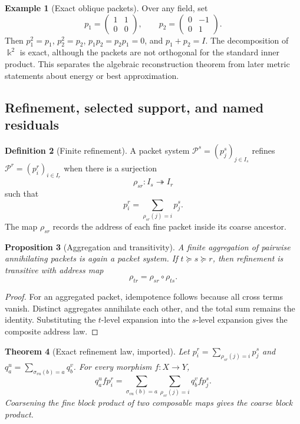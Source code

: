 \documentclass[11pt]{article}
\newtheorem{theorem}{Theorem}[section]
\newtheorem{proposition}[theorem]{Proposition}
\theoremstyle{definition}
\newtheorem{definition}[theorem]{Definition}
\newtheorem{example}[theorem]{Example}
\theoremstyle{remark}
\newcommand{\kk}{\Bbbk}
\begin{document}
\begin{example}[Exact oblique packets]
\label{ex:oblique-packets}
Over any field, set
\[
p_1=
\begin{pmatrix}
1&1\\0&0
\end{pmatrix},
\qquad
p_2=
\begin{pmatrix}
0&-1\\0&1
\end{pmatrix}.
\]
Then \(p_1^2=p_1\), \(p_2^2=p_2\), \(p_1p_2=p_2p_1=0\), and \(p_1+p_2=I\).  The decomposition of \(\kk^2\) is exact, although the packets are not orthogonal for the standard inner product.  This separates the algebraic reconstruction theorem from later metric statements about energy or best approximation.
\end{example}

\subsection{Refinement, selected support, and named residuals}
\label{subsec:refinement-residual-calculus}

\begin{definition}[Finite refinement]
\label{def:finite-refinement-expanded}
A packet system \(\mathcal P^s=(p^s_j)_{j\in I_s}\) refines \(\mathcal P^r=(p^r_i)_{i\in I_r}\) when there is a surjection
\[
\rho_{sr}:I_s\twoheadrightarrow I_r
\]
such that
\[
p^r_i
=
\sum_{\rho_{sr}(j)=i}p^s_j.
\]
The map \(\rho_{sr}\) records the address of each fine packet inside its coarse ancestor.
\end{definition}

\begin{proposition}[Aggregation and transitivity]
\label{prop:refinement-aggregation-transitivity}
A finite aggregation of pairwise annihilating packets is again a packet system.  If \(t\succeq s\succeq r\), then refinement is transitive with address map
\[
\rho_{tr}=\rho_{sr}\circ\rho_{ts}.
\]
\end{proposition}

\begin{proof}
For an aggregated packet, idempotence follows because all cross terms vanish.  Distinct aggregates annihilate each other, and the total sum remains the identity.  Substituting the \(t\)-level expansion into the \(s\)-level expansion gives the composite address law.
\end{proof}

\begin{theorem}[Exact refinement law, imported]
\label{thm:exact-refinement-expanded}
Let \(p^r_i=\sum_{\rho_{sr}(j)=i}p^s_j\) and \(q^u_a=\sum_{\sigma_{vu}(b)=a}q^v_b\).  For every morphism \(f:X\to Y\),
\[
\boxed{
q^u_afp^r_i
=
\sum_{\sigma_{vu}(b)=a}
\sum_{\rho_{sr}(j)=i}
q^v_bfp^s_j.}
\]
Coarsening the fine block product of two composable maps gives the coarse block product.
\end{theorem}
\end{document}
